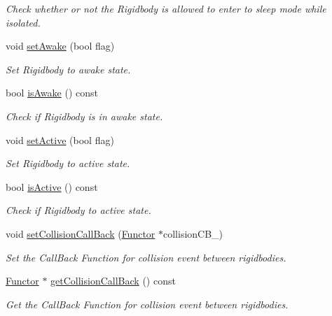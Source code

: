 \begin{DoxyCompactItemize}
\begin{DoxyCompactList}\small\item\em Check whether or not the Rigidbody is allowed to enter to sleep mode while isolated. \end{DoxyCompactList}\item 
void \hyperlink{class_i_dream_sky_1_1_physics3_1_1_rigid_body_a4d9ee1a2ba1d9c09d711b3d5a00bab48}{set\+Awake} (bool flag)
\begin{DoxyCompactList}\small\item\em Set Rigidbody to awake state. \end{DoxyCompactList}\item 
bool \hyperlink{class_i_dream_sky_1_1_physics3_1_1_rigid_body_adf56d13f35a8f358864885ec97ac65a5}{is\+Awake} () const 
\begin{DoxyCompactList}\small\item\em Check if Rigidbody is in awake state. \end{DoxyCompactList}\item 
void \hyperlink{class_i_dream_sky_1_1_physics3_1_1_rigid_body_a200da59764cfc4196cc3db7eb39bb262}{set\+Active} (bool flag)
\begin{DoxyCompactList}\small\item\em Set Rigidbody to active state. \end{DoxyCompactList}\item 
bool \hyperlink{class_i_dream_sky_1_1_physics3_1_1_rigid_body_a2769e904a08ef6714836a0885016b476}{is\+Active} () const 
\begin{DoxyCompactList}\small\item\em Check if Rigidbody to active state. \end{DoxyCompactList}\item 
void \hyperlink{class_i_dream_sky_1_1_physics3_1_1_rigid_body_ab47a2db4795a49195dc59620ba4ab52c}{set\+Collision\+Call\+Back} (\hyperlink{class_i_dream_sky_1_1_functor}{Functor} $\ast$collision\+C\+B\+\_\+)
\begin{DoxyCompactList}\small\item\em Set the Call\+Back Function for collision event between rigidbodies. \end{DoxyCompactList}\item 
\hyperlink{class_i_dream_sky_1_1_functor}{Functor} $\ast$ \hyperlink{class_i_dream_sky_1_1_physics3_1_1_rigid_body_af489937982e89fffadde2a4885d0c9ce}{get\+Collision\+Call\+Back} () const 
\begin{DoxyCompactList}\small\item\em Get the Call\+Back Function for collision event between rigidbodies. \end{DoxyCompactList}\item 

\end{DoxyCompactItemize}
